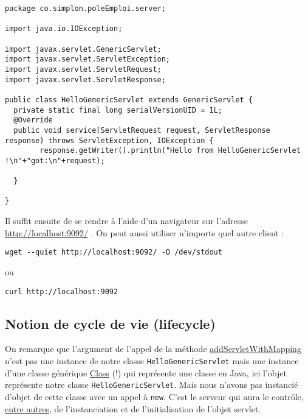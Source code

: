 \documentclass[11pt]{article}
\begin{document}
\begin{verbatim}
package co.simplon.poleEmploi.server;

import java.io.IOException;

import javax.servlet.GenericServlet;
import javax.servlet.ServletException;
import javax.servlet.ServletRequest;
import javax.servlet.ServletResponse;

public class HelloGenericServlet extends GenericServlet {
  private static final long serialVersionUID = 1L;
  @Override
  public void service(ServletRequest request, ServletResponse response) throws ServletException, IOException {
        response.getWriter().println("Hello from HelloGenericServlet !\n"+"got:\n"+request);

  }

}
\end{verbatim}

Il suffit ensuite de se rendre à l'aide d'un navigateur sur l'adresse
\url{http://localhost:9092/} . On peut aussi utiliser n'importe quel autre client :
\begin{verbatim}
wget --quiet http://localhost:9092/ -O /dev/stdout
\end{verbatim}
ou
\begin{verbatim}
curl http://localhost:9092
\end{verbatim}

\subsection{Notion de cycle de vie (lifecycle)}
\label{sec:org5767318}

On remarque que l'argument de l'appel de la méthode \href{https://www.eclipse.org/jetty/javadoc/9.4.6.v20170531/org/eclipse/jetty/servlet/ServletHandler.html#addServletWithMapping-java.lang.Class-java.lang.String-}{addServletWithMapping} n'est
pas une instance de notre classe \texttt{HelloGenericServlet} mais une instance d'une
classe générique \href{http://docs.oracle.com/javase/8/docs/api/java/lang/Class.html?is-external=true}{Class} (!) qui représente une classe en Java, ici l'objet
représente notre classe \texttt{HelloGenericServlet}. Mais nous n'avons pas instancié
d'objet de cette classe avec un appel à \texttt{new}. C'est le serveur qui aura le
contrôle, \href{https://docs.oracle.com/javaee/7/tutorial/servlets002.htm}{entre autres}, de l'instanciation et de l'initialisation de l'objet
servlet.
\end{document}
